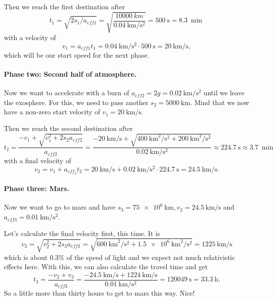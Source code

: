 \documentclass[10pt]{article}
\numberwithin{equation}{section}
\begin{document}
	Then we reach the first destination after	
	\begin{equation}
		t_1 = \sqrt{2s_1/a_{eff1}} = \sqrt{\frac{\SI{10000}{km}}{\SI{0.04}{\km\per\s\squared}}} = \SI{500}{\s} = \SI{8.3}{\min}	\end{equation}	
	with a velocity of
	\begin{equation}
		v_1=a_{eff1}t_1=\SI{0.04}{\km\per\s\squared} \cdot \SI{500}{\s} = \SI{20}{\km\per\s}, \end{equation}	
	which will be our start speed for the next phase.
	
	\paragraph{Phase two: Second half of atmosphere.}
	Now we want to accelerate with a burn of $a_{eff2}=2g=\SI{0.02}{\km\per\s\squared}$ until we leave the exosphere. For this, we need to pass another $s_2=\SI{5000}{\km}$. Mind that we now have a non-zero start velocity of $v_1 = \SI{20}{\km\per\s}$.
	
	Then we reach the second destination after
	\begin{equation}
		t_2 = \frac{-v_1+\sqrt{v^2_1+2s_2a_{eff2}}}{a_{eff2}} = \frac {\SI{-20}{\km\per\s}+\sqrt{\SI{400}{\km\squared\per\s\squared}+\SI{200}{\km\squared\per\s\squared}}} {\SI{0.02}{\km\per\s\squared}}
		\approx \SI{224.7}{\s} \approx \SI{3.7}{\min} \end{equation}
	with a final velocity of
	\begin{equation}
		v_2 = v_1 + a_{eff_2}t_2
		= \SI{20}{\km\per\s} + \SI{0.02}{\km\per\s\squared} \cdot \SI{224.7}{\s}
		= \SI{24.5}{\km\per\s}. \end{equation}
	
	\paragraph{Phase three: Mars.}	
	Now we want to go to mars and have $s_3 = \SI{75e+6}{\km}, v_2 = \SI{24.5}{\km\per\s}$ and $a_{eff3} = \SI{0.01}{\km\per\s\squared}$.
	
	Let's calculate the final velocity first, this time. It is
	\begin{equation}
		v_3 = \sqrt{v^2_2 + 2s_3 a_{eff3}}
		= \sqrt{\SI{600}{\km\squared\per\s\squared} + \SI{1.5e+6}{\km\squared\per\s\squared}}
		= \SI{1225}{\km\per\s} \end{equation}
	which is about $0.3 \%$ of the speed of light and we expect not much relativistic effects here. With this, we can also calculate the travel time and get
	\begin{equation}
		t_3 = \frac{-v_2 + v_3}{a_{eff3}}
		= \frac{\SI{-24,5}{\km\per\s} + \SI{1224}{\km\per\s}}{\SI{0.01}{\km\per\s\squared}}
		= \SI{120049}{\s} = \SI{33.3}{\hour}. \end{equation}
	So a little more than thirty hours to get to mars this way. Nice!
	
\end{document}
